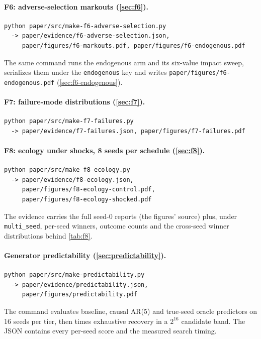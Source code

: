 \paragraph{F6: adverse-selection markouts (\cref{sec:f6}).}
\begin{verbatim}
python paper/src/make-f6-adverse-selection.py
  -> paper/evidence/f6-adverse-selection.json,
     paper/figures/f6-markouts.pdf, paper/figures/f6-endogenous.pdf
\end{verbatim}
The same command runs the endogenous arm and its six-value impact sweep, serializes them under the \texttt{endogenous} key and writes \texttt{paper/figures/f6-endogenous.pdf} (\cref{sec:f6-endogenous}).

\paragraph{F7: failure-mode distributions (\cref{sec:f7}).}
\begin{verbatim}
python paper/src/make-f7-failures.py
  -> paper/evidence/f7-failures.json, paper/figures/f7-failures.pdf
\end{verbatim}

\paragraph{F8: ecology under shocks, 8 seeds per schedule (\cref{sec:f8}).}
\begin{verbatim}
python paper/src/make-f8-ecology.py
  -> paper/evidence/f8-ecology.json,
     paper/figures/f8-ecology-control.pdf,
     paper/figures/f8-ecology-shocked.pdf
\end{verbatim}
The evidence carries the full seed-0 reports (the figures' source) plus, under \texttt{multi\_seed}, per-seed winners, outcome counts and the cross-seed winner distributions behind \cref{tab:f8}.

\paragraph{Generator predictability (\cref{sec:predictability}).}
\begin{verbatim}
python paper/src/make-predictability.py
  -> paper/evidence/predictability.json,
     paper/figures/predictability.pdf
\end{verbatim}
The command evaluates baseline, causal AR(5) and true-seed oracle predictors on 16 seeds per tier, then times exhaustive recovery in a $2^{16}$ candidate band. The JSON contains every per-seed score and the measured search timing.

